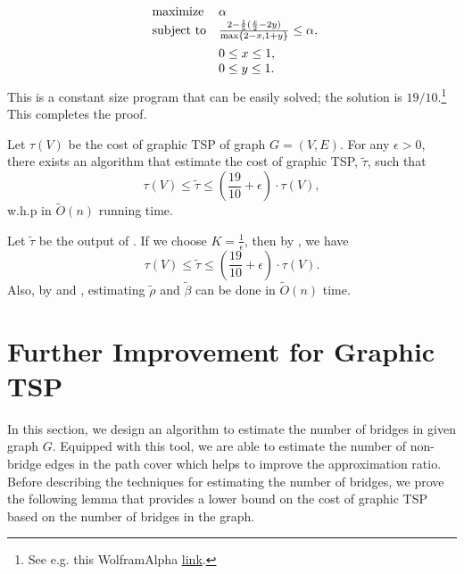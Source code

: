 \begin{myproof}
\begin{align*}
\begin{array}{ll@{}ll}
\text{maximize}  & \alpha \\
\vspace{5px}\text{subject to}& \frac{2 - \frac{1}{5}(\frac{x}{2} - 2y)}{\max\{2-x, 1+y\}} \leq \alpha,\\
                & 0\leq x \leq 1,\\
                 & 0\leq y \leq 1.
\end{array}
\end{align*}
This is a constant size program that can be easily solved; the solution is $19/10$.\footnote{See e.g. this WolframAlpha \href{https://www.wolframalpha.com/input?i=Maximize\%5B\%282-1\%2F5*\%28x\%2F2+-+2y\%29\%29+\%2F+Max\%5B2-x\%2C+1\%2By\%5D\%2C+\%7B0\%3C\%3D+x+\%3C\%3D1\%2C+0\%3C\%3Dy\%3C\%3D1\%7D\%2C+\%7Bx\%2Cy\%7D\%5D}{link}.} This completes the proof.
\end{myproof}



\begin{theorem}\label{thm: graphic-tsp}
Let $\tau(V)$ be the cost of graphic TSP of graph $G = (V, E)$. For any $\epsilon > 0$, there exists an algorithm that estimate the cost of graphic TSP, $\tilde{\tau}$, such that
$$
\tau(V) \leq \tilde{\tau} \leq (\frac{19}{10} + \epsilon) \cdot \tau(V),
$$
w.h.p in $\tilde{O}(n)$ running time.
\end{theorem}
\begin{myproof}
Let $\tilde{\tau}$ be the output of . If we choose $K = \frac{1}{\epsilon}$, then by , we have 
$$
\tau(V) \leq \tilde{\tau} \leq (\frac{19}{10} + \epsilon) \cdot \tau(V).
$$
Also, by  and , estimating $\tilde{\rho}$ and $\tilde{\beta}$ can be done in $\tilde{O}(n)$ time.
\end{myproof}


\section{Further Improvement for Graphic TSP}\label{sec:graphic-TSP-major}
In this section, we design an algorithm to estimate the number of bridges in given graph $G$. Equipped with this tool, we are able to estimate the number of non-bridge edges in the path cover which helps to improve the approximation ratio. Before describing the techniques for estimating the number of bridges, we prove the following lemma that provides a lower bound on the cost of graphic TSP based on the number of bridges in the graph.

